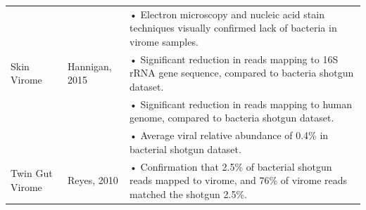 \documentclass[12pt,]{article}
\begin{document}
\begin{longtable}[]{@{}lll@{}}
\begin{minipage}[t]{0.24\columnwidth}
\strut\end{minipage} &
\begin{minipage}[t]{0.17\columnwidth}\raggedright\strut
\strut\end{minipage} &
\begin{minipage}[t]{0.50\columnwidth}\raggedright\strut
• Electron microscopy and nucleic acid stain techniques visually
confirmed lack of bacteria in virome samples.
\strut\end{minipage}\tabularnewline
\begin{minipage}[t]{0.24\columnwidth}\raggedright\strut
Skin Virome
\strut\end{minipage} &
\begin{minipage}[t]{0.17\columnwidth}\raggedright\strut
Hannigan, 2015
\strut\end{minipage} &
\begin{minipage}[t]{0.50\columnwidth}\raggedright\strut
• Significant reduction in reads mapping to 16S rRNA gene sequence,
compared to bacteria shotgun dataset.
\strut\end{minipage}\tabularnewline
\begin{minipage}[t]{0.24\columnwidth}\raggedright\strut
\strut\end{minipage} &
\begin{minipage}[t]{0.17\columnwidth}\raggedright\strut
\strut\end{minipage} &
\begin{minipage}[t]{0.50\columnwidth}\raggedright\strut
• Significant reduction in reads mapping to human genome, compared to
bacteria shotgun dataset.
\strut\end{minipage}\tabularnewline
\begin{minipage}[t]{0.24\columnwidth}\raggedright\strut
\strut\end{minipage} &
\begin{minipage}[t]{0.17\columnwidth}\raggedright\strut
\strut\end{minipage} &
\begin{minipage}[t]{0.50\columnwidth}\raggedright\strut
• Average viral relative abundance of 0.4\% in bacterial shotgun
dataset.
\strut\end{minipage}\tabularnewline
\begin{minipage}[t]{0.24\columnwidth}\raggedright\strut
Twin Gut Virome
\strut\end{minipage} &
\begin{minipage}[t]{0.17\columnwidth}\raggedright\strut
Reyes, 2010
\strut\end{minipage} &
\begin{minipage}[t]{0.50\columnwidth}\raggedright\strut
• Confirmation that 2.5\% of bacterial shotgun reads mapped to virome,
and 76\% of virome reads matched the shotgun 2.5\%.
\strut\end{minipage}\tabularnewline
\bottomrule
\end{longtable}
\end{document}
